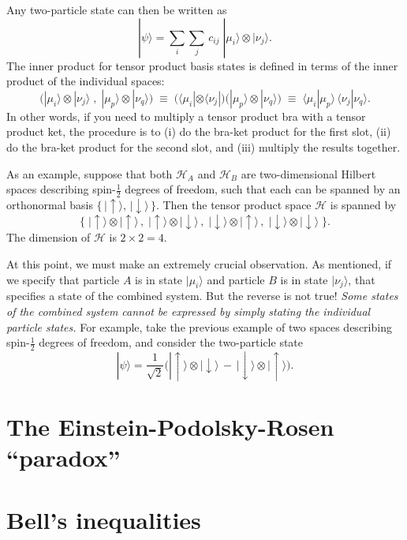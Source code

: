 \documentclass[pra,11pt]{revtex4}
\begin{document}
Any two-particle state can then be written as
$$|\psi\rangle = \sum_{i} \sum_{j} \, c_{ij}\; |\mu_i\rangle \otimes |\nu_j\rangle.$$
The inner product for tensor product basis states is defined in terms
of the inner product of the individual spaces:
$$\Big(|\mu_i\rangle \otimes |\nu_j\rangle\;,\; |\mu_p\rangle \otimes |\nu_q\rangle \Big) \;\equiv\; \big(\langle\mu_i| \otimes \langle\nu_j| \big) \big(|\mu_p\rangle \otimes |\nu_q\rangle\big) \;\equiv\; \langle\mu_i|\mu_p\rangle \, \langle\nu_j|\nu_q\rangle.$$
In other words, if you need to multiply a tensor product bra with a
tensor product ket, the procedure is to (i) do the bra-ket product for
the first slot, (ii) do the bra-ket product for the second slot, and
(iii) multiply the results together.

As an example, suppose that both $\mathscr{H}_A$ and $\mathscr{H}_B$
are two-dimensional Hilbert spaces describing spin-$\frac{1}{2}$
degrees of freedom, such that each can be spanned by an orthonormal basis
$\{\,|\!\uparrow\rangle, \,|\downarrow\rangle \, \}$.  Then the tensor
product space $\mathscr{H}$ is spanned by
$$\Big\{\;|\uparrow\rangle\otimes|\uparrow\rangle\,,\; |\uparrow\rangle\otimes|\downarrow\rangle\,,\; |\downarrow\rangle\otimes|\uparrow\rangle\,,\; |\downarrow\rangle\otimes|\downarrow\rangle \;\Big\}.$$
The dimension of $\mathscr{H}$ is $2 \times 2 = 4$.  

At this point, we must make an extremely crucial observation.  As
mentioned, if we specify that particle $A$ is in state $|\mu_i\rangle$
and particle $B$ is in state $|\nu_j\rangle$, that specifies a state
of the combined system.  But the reverse is not true!  \textit{Some
  states of the combined system cannot be expressed by simply stating
  the individual particle states.}  For example, take the previous
example of two spaces describing spin-$\frac{1}{2}$ degrees of
freedom, and consider the two-particle state
$$|\psi\rangle = \frac{1}{\sqrt{2}} \Big(|\uparrow\rangle\otimes|\downarrow\rangle \,-\, |\downarrow\rangle\otimes|\uparrow\rangle\Big).$$

\section{The Einstein-Podolsky-Rosen ``paradox''}


\section{Bell's inequalities}
\end{document}
